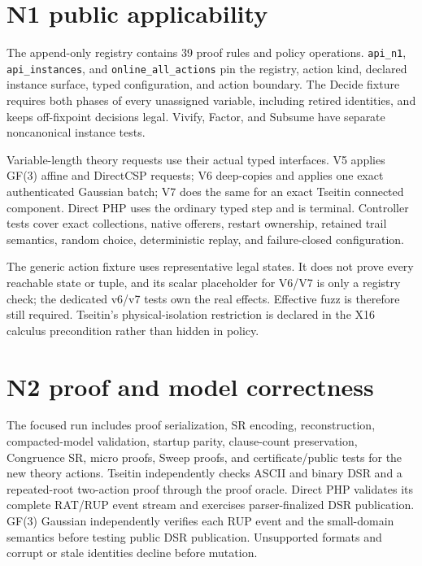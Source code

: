 \documentclass[11pt]{article}
\newcommand{\code}[1]{\texttt{#1}}
\begin{document}
\section*{N1 public applicability}

The append-only registry contains 39 proof rules and policy operations.
\code{api\_n1}, \code{api\_instances}, and
\code{online\_all\_actions} pin the registry, action kind, declared instance
surface, typed configuration, and action boundary.  The Decide fixture requires
both phases of every unassigned variable, including retired identities, and
keeps off-fixpoint decisions legal.  Vivify, Factor, and Subsume have separate
noncanonical instance tests.

Variable-length theory requests use their actual typed interfaces.  V5 applies
GF(3) affine and DirectCSP requests; V6 deep-copies and applies one exact
authenticated Gaussian batch; V7 does the same for an exact Tseitin connected
component.  Direct PHP uses the ordinary typed step and is terminal.  Controller
tests cover exact collections, native offerers, restart ownership, retained
trail semantics, random choice, deterministic replay, and failure-closed
configuration.

The generic action fixture uses representative legal states.  It does not prove
every reachable state or tuple, and its scalar placeholder for V6/V7 is only a
registry check; the dedicated v6/v7 tests own the real effects.  Effective fuzz
is therefore still required.  Tseitin's physical-isolation restriction is
declared in the X16 calculus precondition rather than hidden in policy.

\section*{N2 proof and model correctness}

The focused run includes proof serialization, SR encoding, reconstruction,
compacted-model validation, startup parity, clause-count preservation,
Congruence SR, micro proofs, Sweep proofs, and certificate/public tests for the
new theory actions.  Tseitin independently checks ASCII and binary DSR and a
repeated-root two-action proof through the proof oracle.  Direct PHP validates
its complete RAT/RUP event stream and exercises parser-finalized DSR
publication.  GF(3) Gaussian independently verifies each RUP event and the
small-domain semantics before testing public DSR publication.  Unsupported
formats and corrupt or stale identities decline before mutation.
\end{document}
